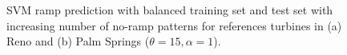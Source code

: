 \documentclass[10pt, conference, compsocconf]{IEEEtran}
\begin{document}
\begin{figure}[thb]
\centering
{}
\caption{SVM ramp prediction with balanced training set and test set with increasing number of no-ramp patterns for references turbines in (a) Reno and (b) Palm Springs ($\theta = 15, \alpha = 1$).}
\label{fig:unbalanced1}
\end{figure}
\end{document}
